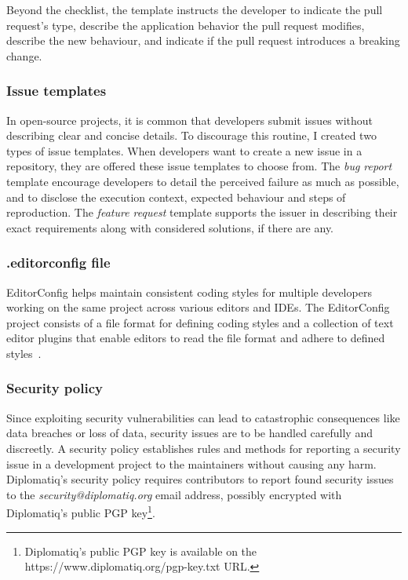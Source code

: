 Beyond the checklist, the template instructs the developer to indicate the pull request's type, describe the application behavior the pull request modifies, describe the new behaviour, and indicate if the pull request introduces a breaking change.

\subsubsection{Issue templates}

In open-source projects, it is common that developers submit issues without describing clear and concise details. To discourage this routine, I created two types of issue templates. When developers want to create a new issue in a repository, they are offered these issue templates to choose from. The \emph{bug report} template encourage developers to detail the perceived failure as much as possible, and to disclose the execution context, expected behaviour and steps of reproduction. The \emph{feature request} template supports the issuer in describing their exact requirements along with considered solutions, if there are any.

\subsubsection{.editorconfig file}

EditorConfig helps maintain consistent coding styles for multiple developers working on the same project across various editors and IDEs. The EditorConfig project consists of a file format for defining coding styles and a collection of text editor plugins that enable editors to read the file format and adhere to defined styles~\cite{editorconfig}.

\subsubsection{Security policy}

Since exploiting security vulnerabilities can lead to catastrophic consequences like data breaches or loss of data, security issues are to be handled carefully and discreetly. A security policy establishes rules and methods for reporting a security issue in a development project to the maintainers without causing any harm. Diplomatiq's security policy requires contributors to report found security issues to the \emph{security@diplomatiq.org} email address, possibly encrypted with Diplomatiq's public PGP key\footnote{Diplomatiq's public PGP key is available on the https://www.diplomatiq.org/pgp-key.txt URL.}.

